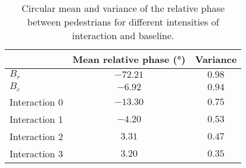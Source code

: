 \begin{table}
\centering
\caption{Circular mean and variance of the relative phase between pedestrians for different intensities of interaction and baseline.}
\label{tab:relative_phase}
\begin{tabular}{lcc}
\toprule
& Mean relative phase (°) & Variance \\
\midrule
$B_r$ & $-72.21$ & $0.98$ \\
$B_c$ & $-6.92$ & $0.94$ \\
\midrule
Interaction 0 & $-13.30$ & $0.75$ \\
Interaction 1 & $-4.20$ & $0.53$ \\
Interaction 2 & $3.31$ & $0.47$ \\
Interaction 3 & $3.20$ & $0.35$ \\
\bottomrule
\end{tabular}
\end{table}
